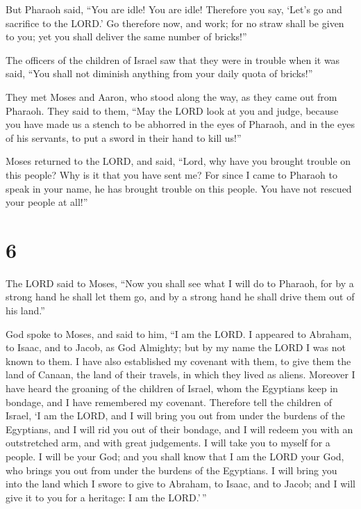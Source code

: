  But Pharaoh said, ``You are idle! You are idle!
Therefore you say, `Let's go and sacrifice to the LORD.' 
Go therefore now, and work; for no straw shall be given to you; yet you
shall deliver the same number of bricks!''

 The officers of the children of Israel saw that they
were in trouble when it was said, ``You shall not diminish anything from
your daily quota of bricks!''

 They met Moses and Aaron, who stood along the way, as
they came out from Pharaoh.  They said to them, ``May the
LORD look at you and judge, because you have made us a stench to be
abhorred in the eyes of Pharaoh, and in the eyes of his servants, to put
a sword in their hand to kill us!''

 Moses returned to the LORD, and said, ``Lord, why have
you brought trouble on this people? Why is it that you have sent me?
 For since I came to Pharaoh to speak in your name, he
has brought trouble on this people. You have not rescued your people at
all!''

\hypertarget{section-5}{%
\section{6}\label{section-5}}

 The LORD said to Moses, ``Now you shall see what I will
do to Pharaoh, for by a strong hand he shall let them go, and by a
strong hand he shall drive them out of his land.''

 God spoke to Moses, and said to him, ``I am the LORD.
 I appeared to Abraham, to Isaac, and to Jacob, as God
Almighty; but by my name the LORD I was not known to them.
 I have also established my covenant with them, to give
them the land of Canaan, the land of their travels, in which they lived
as aliens.  Moreover I have heard the groaning of the
children of Israel, whom the Egyptians keep in bondage, and I have
remembered my covenant.  Therefore tell the children of
Israel, `I am the LORD, and I will bring you out from under the burdens
of the Egyptians, and I will rid you out of their bondage, and I will
redeem you with an outstretched arm, and with great judgements.
 I will take you to myself for a people. I will be your
God; and you shall know that I am the LORD your God, who brings you out
from under the burdens of the Egyptians.  I will bring you
into the land which I swore to give to Abraham, to Isaac, and to Jacob;
and I will give it to you for a heritage: I am the LORD.'\,''

